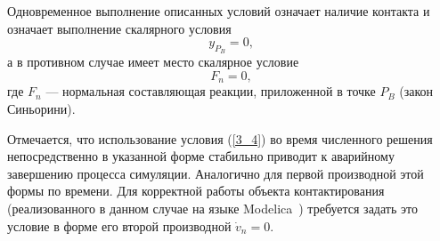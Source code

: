 
Одновременное выполнение описанных условий означает наличие
контакта и означает выполнение скалярного условия 
\begin{equation}
y_{P_B}=0,
\label{3_4}
\end{equation}
а в противном случае имеет место скалярное условие
$$
F_n=0,
$$
где $F_n$ --- нормальная составляющая реакции, приложенной в точке $P_B$ (закон Синьорини).


Отмечается, что использование условия (\ref{3_4}) во время численного решения
непосредственно в указанной форме стабильно приводит к аварийному завершению процесса симуляции.
Аналогично для первой производной этой формы по времени.
Для корректной работы объекта контактирования
(реализованного в данном случае на языке Modelica~\cite{Fritzson})
требуется задать это условие в форме его второй производной $\dot{v}_n=0$.

%

